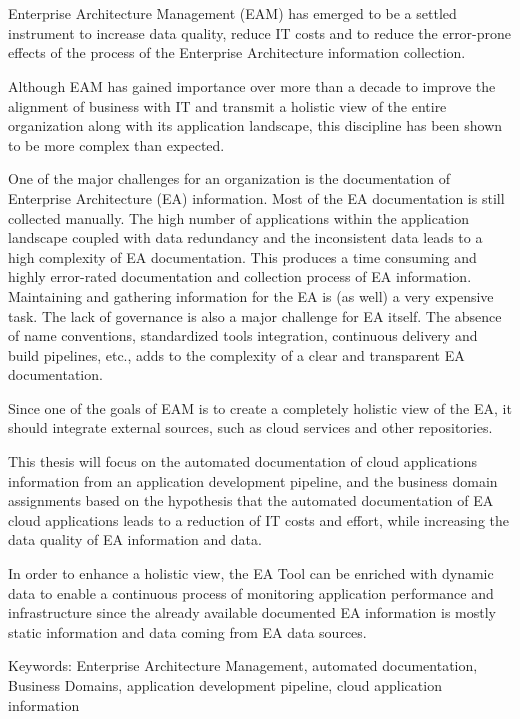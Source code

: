 \chapter{\abstractname}

Enterprise Architecture Management (EAM) has emerged to be a settled instrument to increase data quality, reduce IT costs and to reduce the error-prone effects of the process of the Enterprise Architecture information collection.

Although EAM has gained importance over more than a decade to improve the alignment of business with IT and transmit a holistic view of the entire organization along with its application landscape, this discipline has been shown to be more complex than expected.

One of the major challenges for an organization is the documentation of Enterprise Architecture (EA) information. Most of the EA documentation is still collected manually. The high number of applications within the application landscape coupled with data redundancy and the inconsistent data leads to a high complexity of EA documentation. This produces a time consuming and highly error-rated documentation and collection process of EA information. Maintaining and gathering information for the EA is (as well) a very expensive task.  The lack of governance is also a major challenge for EA itself. The absence of name conventions, standardized tools integration, continuous delivery and build pipelines, etc., adds to the complexity of a clear and transparent EA documentation.

Since one of the goals of EAM is to create a completely holistic view of the EA, it should integrate external sources, such as cloud services and other repositories.

This thesis will focus on the automated documentation of cloud applications information from an application development pipeline, and the business domain assignments based on the hypothesis that the automated documentation of EA cloud applications leads to a reduction of IT costs and effort, while increasing the data quality of EA information and data.

In order to enhance a holistic view, the EA Tool can be enriched with dynamic data to enable a continuous process of monitoring application performance and infrastructure since the already available documented EA information is mostly static information and data coming from EA data sources.

Keywords: Enterprise Architecture Management, automated documentation, Business Domains, application development pipeline, cloud application information
